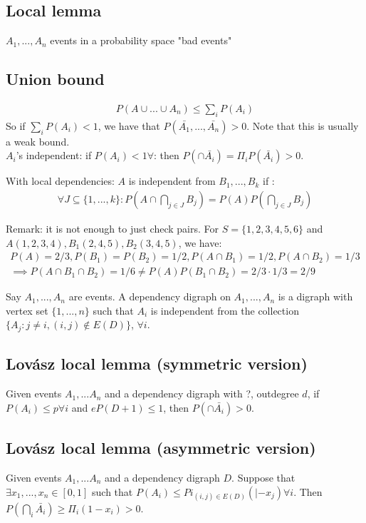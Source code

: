 \subsection{Local lemma}
$A_1, ..., A_n$ events in a probability space "bad events"
\subsection{Union bound}
\begin{eqnarray}
	P(A \cup ... \cup A_n) \leq \sum_i P(A_i)
\end{eqnarray}
So if $\sum_i P(A_i) < 1$, we have that $P(\bar{A_1}, ..., \bar{A_n}) > 0$. Note that this is usually a weak bound.\\

$A_i$'s independent: if $P(A_i) < 1 \forall$: then $P(\cap \bar{A_i}) = \Pi_i P(\bar{A_i}) > 0$.

With local dependencies: $A$ is independent from $B_1, ..., B_k$ if :
\begin{eqnarray}
	\forall J \subseteq \{1,...,k\} : P(A \cap \bigcap_{j \in J} B_j) = P(A) P(\bigcap_{j \in J}B_j)
\end{eqnarray}

Remark: it is not enough to just check pairs. For $S = \{1,2,3,4,5,6\}$ and $A(1,2,3,4), B_1(2,4,5), B_2(3,4,5)$, we have:
\begin{eqnarray}
	P(A) = 2/3, P(B_1) = P(B_2) = 1/2, P(A \cap B_1) = 1/2, P(A \cap B_2) = 1/3\\
	\implies P(A \cap B_1 \cap B_2) = 1/6 \neq P(A) P(B_1 \cap B_2) = 2/3 \cdot 1/3 = 2/9 
\end{eqnarray}

Say $A_1, ..., A_n$ are events. A dependency digraph on $A_1, ..., A_n$ is a digraph with vertex set $\{ 1, ..., n \}$ such that $A_i$ is independent from the collection $\{ A_j : j \neq i, (i,j) \notin E(D) \}$, $\forall i$.

\subsection{Lovász local lemma (symmetric version)}
Given events $A_1,...A_n$ and a dependency digraph with ?, outdegree $d$, if $P(A_i) \leq p \forall i$ and $eP(D+1) \leq 1$, then $P(\cap \bar{A_i}) > 0$.

\subsection{Lovász local lemma (asymmetric version)}
Given events $A_1,...A_n$ and a dependency digraph $D$.
Suppose that $\exists x_1, ..., x_n \in [0,1]$ such that $P(A_i) \leq Pi_{(i,j) \in E(D)}( |- x_j) \forall i$. Then $P(\bigcap_i \bar{A_i}) \geq \Pi_i (1 - x_i) > 0$.

